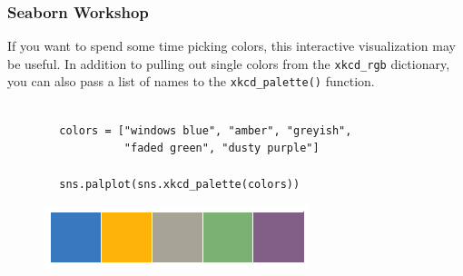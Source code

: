 \documentclass{beamer}
\begin{document}
	\begin{frame}[fragile]
		\frametitle{Seaborn Workshop}
		\large
		If you want to spend some time picking colors, this interactive visualization may be useful. In addition to pulling out single colors from the \texttt{xkcd\_rgb} dictionary, you can also pass a list of names to the \texttt{xkcd\_palette()} function.
		\begin{verbatim}
		
		colors = ["windows blue", "amber", "greyish", 
		          "faded green", "dusty purple"]
		          
		sns.palplot(sns.xkcd_palette(colors))
		\end{verbatim}
		
		\begin{figure}
			\centering
			\includegraphics[width=0.7\linewidth]{images/color_palettes_23_0}
			
		\end{figure}
		
	\end{frame}
	
\end{document}
